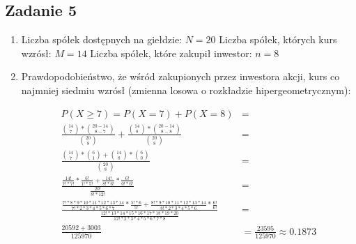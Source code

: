 \subsection{Zadanie 5}

\begin{enumerate}[label=(\alph*)]
\item
Liczba spółek dostępnych na giełdzie: $N=20$
Liczba spółek, których kurs wzrósł: $M=14$
Liczba spółek, które zakupił inwestor: $n=8$

\item Prawdopodobieństwo, że wśród zakupionych przez inwestora akcji,
kurs co najmniej siedmiu wzrósł (zmienna losowa o rozkładzie hipergeometrycznym):

\begin{align*}
P(X \geq 7)=P(X=7)+P(X=8) &= \\
\frac{\binom{14}{7}* \binom{20-14}{8-7}}{\binom{20}{8}}+\frac{\binom{14}{8}* \binom{20-14}{8-8}}{\binom{20}{8}} &= \\
\frac{\binom{14}{7}*\binom{6}{1}+\binom{14}{8}*\binom{6}{0}}{\binom{20}{8}} &= \\
\frac{\frac{14!}{7!*7!}*\frac{6!}{1!*5!}+\frac{14!}{8!*6!}*\frac{6!}{0!*6!}}{\frac{20!}{8!*12!}} &= \\
\frac{\frac{7!*8*9*10*11*12*13*14}{7!*2*3*4*5*6*7}*\frac{5!*6}{5!}+\frac{8!*9*10*11*12*13*14}{8!*2*3*4*5*6}*\frac{6!}{6!}}{\frac{12!*13*14*15*16*17*18*19*20}{12!*2*3*4*5*6*7*8}} &= \\
\frac{20592+3003}{125970} &=
\frac{23595}{125970}\approx 0.1873
\end{align*}

\end{enumerate}
